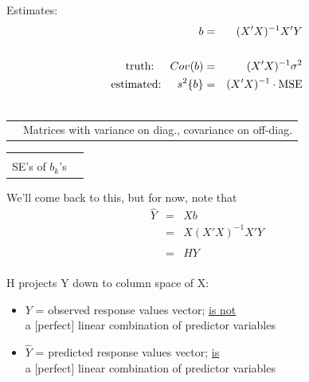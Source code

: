 \documentclass[12pt]{../notes}
\begin{document}
Estimates:
\begin{eqnarray}
  b & = & (X' X)^{-1} X' Y \nonumber \\
   & \nonumber \\
  \mbox{truth: \hspace{1em}} Cov(b) & = & (X' X)^{-1} \sigma^2 \nonumber \\
  \mbox{estimated: \hspace{1em}}  s^2 \{ b \} & = & (X' X)^{-1} \cdot \mbox{MSE} \nonumber \\
   & \nonumber
\end{eqnarray}

\vspace{-8.5em}
\begin{tabular}{l l}
\hspace{30em} &
\begin{minipage}[t]{2in}
 Matrices with variance on diag., covariance on off-diag.
\end{minipage}
\end{tabular}

\vspace{2.75em}
\begin{tabular}{l l}
\hspace{32em} &
\begin{minipage}[t]{2in}
 $\sqrt{\mbox{diag. elements}}$ gives\\ SE's of $b_k$'s
\end{minipage}
\end{tabular}

\vspace{1em}

We'll come back to this, but for now, note that
\begin{eqnarray}
  \hat{Y} & = & X b \nonumber \\
          & = & X (X' X)^{-1} X' Y \nonumber \\
          & \nonumber \\
          & = & H Y \nonumber \\
          & \nonumber
\end{eqnarray}

H projects Y down to column space of X:\\

\begin{minipage}[t]{4in}
  \begin{itemize}
    \item $Y$ = observed response values vector; \underline{is not}\\ a [perfect] linear combination of predictor variables
    \item $\hat{Y}$ = predicted response values vector; \underline{is}\\ a [perfect] linear combination of predictor variables
  \end{itemize}
\end{minipage}













\end{document}
